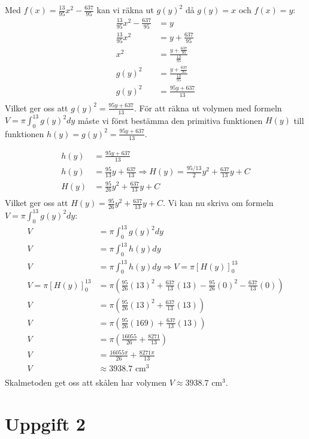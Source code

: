\documentclass[12pt]{article}
\begin{document}
\newpage
Med $f(x)=\frac{13}{95}x^2-\frac{637}{95}$ kan vi räkna ut $g{(y)}^2$ då $g(y)=x$ och $f(x)=y$:
\begin{align*}
    \frac{13}{95}x^2-\frac{637}{95}&=y\\
    \frac{13}{95}x^2&=y+\frac{637}{95}\\
    x^2&=\frac{y+\frac{637}{95}}{\frac{13}{95}}\\
    g{(y)}^2&=\frac{y+\frac{637}{95}}{\frac{13}{95}}\\
    g{(y)}^2&=\frac{95y+637}{13}\\
\end{align*}
Vilket ger oss att $g{(y)}^2=\frac{95y+637}{13}$.
För att räkna ut volymen med formeln $V=\pi\int_{0}^{13}{g(y)}^2dy$ måste vi först bestämma den primitiva funktionen $H(y)$ till funktionen $h(y)=g{(y)}^2=\frac{95y+637}{13}$.

\begin{align*}
    h(y)&=\frac{95y+637}{13}\\
    h(y)&=\frac{95}{13}y+\frac{637}{13} \Rightarrow H(y)=\frac{95/13}{2}y^2+\frac{637}{13}y+C\\
    H(y)&=\frac{95}{26}y^2+\frac{637}{13}y+C\\
\end{align*}
Vilket ger oss att $H(y)=\frac{95}{26}y^2+\frac{637}{13}y+C$.
\newpage
Vi kan nu skriva om formeln $V=\pi\int_{0}^{13}{g(y)}^2dy$:
\begin{align*}
    V&=\pi\int_{0}^{13}{g(y)}^2dy\\
    V&=\pi\int_{0}^{13}{h(y)}dy\\
    V&=\pi\int_{0}^{13}{h(y)}dy\Rightarrow V=\pi{\left[{H(y)}\right]}_{0}^{13}\\
    V=\pi{\left[{H(y)}\right]}_{0}^{13}&=\pi\left(\frac{95}{26}{(13)}^2+\frac{637}{13}(13)-\frac{95}{26}{(0)}^2-\frac{637}{13}(0)\right)\\
    V&=\pi\left(\frac{95}{26}{(13)}^2+\frac{637}{13}(13)\right)\\
    V&=\pi\left(\frac{95}{26}{(169)}+\frac{637}{13}(13)\right)\\
    V&=\pi\left(\frac{16055}{26}+\frac{8271}{13}\right)\\
    V&=\frac{16055\pi}{26}+\frac{8271\pi}{13}\\
    V&\approx 3938.7\text{ cm}^3\\
\end{align*}
Skalmetoden get oss att skålen har volymen $V\approx 3938.7\text{ cm}^3$.
\newpage
\section{Uppgift 2}
\end{document}

